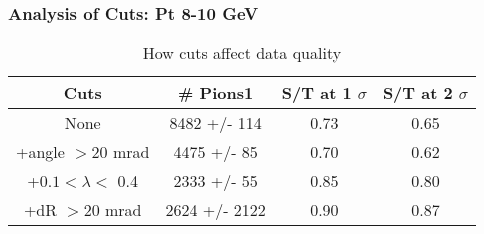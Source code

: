 \frame
{
\frametitle{Analysis of Cuts: Pt  8-10 GeV}
\begin{table}
\caption{How cuts affect data quality}
\centering
\begin{tabular}{c c c c}
\hline\hline
Cuts & \# Pions1 & S/T at 1 $\sigma$ & S/T at 2 $\sigma$ \\ [0.5ex]
\hline
None & 8482 +/-  114 & 0.73 & 0.65 \\ %
+angle $> 20$ mrad & 4475 +/-   85 & 0.70 & 0.62 \\ %
+$0.1 < \lambda <$ 0.4 & 2333 +/-   55 & 0.85 & 0.80 \\ %
+dR $> 20$ mrad & 2624 +/- 2122 & 0.90 & 0.87 \\ %
[1ex]
\hline
\end{tabular}
\label{table:nonlin}
\end{table}
}
